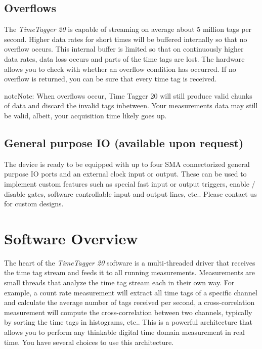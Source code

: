\documentclass[letterpaper,10pt,english]{sphinxmanual}
\begin{document}
\section{Overflows}
\label{sections/hardware:overflows}
The \emph{TimeTagger 20} is capable of streaming on average about 5 million tags per second.
Higher data rates for short times will be buffered internally so that no overflow occurs.
This internal buffer is limited so that on continuously higher data rates, data loss occurs and parts of the time tags are lost. The hardware allows you to check with  whether an overflow condition
has occurred. If no overflow is returned, you can be sure that every time tag is received.

\begin{notice}{note}{Note:}
When overflows occur, Time Tagger 20 will still produce valid chunks of data
and discard the invalid tags inbetween. Your measurements data may still be valid, albeit,
your acquisition time likely goes up.
\end{notice}


\section{General purpose IO (available upon request)}
\label{sections/hardware:general-purpose-io-available-upon-request}
The device is ready to be equipped with up to four SMA connectorized general purpose IO ports and an external clock input or output.
These can be used to implement custom features such as special fast input or output triggers, enable / disable gates,
software controllable input and output lines, etc.. Please contact us for custom designs.


\chapter{Software Overview}
\label{sections/software:software-overview}\label{sections/software::doc}
The heart of the \emph{TimeTagger 20} software is a multi-threaded driver
that receives the time tag stream and feeds it to all running
measurements. Measurements are small threads that analyze the time tag stream
each in their own way. For example, a count rate measurement will extract all time
tags of a specific channel and calculate the average number of tags received per
second, a cross-correlation measurement will compute the cross-correlation between two
channels, typically by sorting the time tags in histograms, etc.. This is a
powerful architecture that allows you to perform any thinkable digital time domain
measurement in real time. You have several choices to use this architecture.
\end{document}
